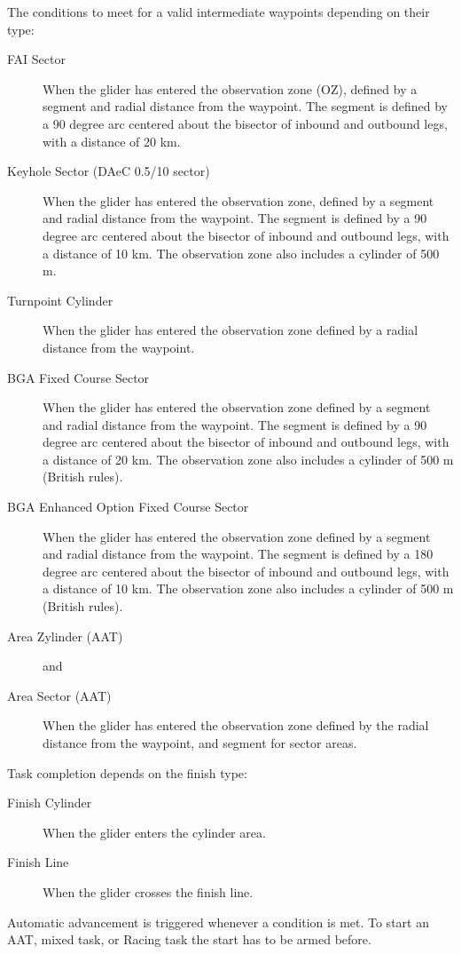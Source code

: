 \documentclass[a4paper,12pt]{refrep}
\begin{document}
The conditions to meet for a valid intermediate waypoints depending on their
 type:
\begin{description}
\item[FAI Sector] When the glider has entered the observation zone (OZ), defined 
by a segment and radial distance from the waypoint.  The segment is
defined by a 90 degree arc centered about the bisector of inbound and
outbound legs, with a distance of 20 km.
\item[Keyhole Sector (DAeC 0.5/10 sector)] When the glider has entered the
observation zone, defined by a segment and radial distance from the waypoint.  The segment is
defined by a 90 degree arc centered about the bisector of inbound and
outbound legs, with a distance of 10 km.  The observation zone also includes
a cylinder of 500 m.
\item[Turnpoint Cylinder]  When the glider has entered the observation zone
defined by a radial distance from the waypoint.
\item[BGA Fixed Course Sector]  When the glider has entered the
observation zone defined by a segment and radial distance from the
waypoint. The segment is defined by a 90 degree arc centered about the
bisector of inbound and outbound legs, with a distance of 20 km.
The observation zone also includes a cylinder of 500 m (British rules).
\item[BGA Enhanced Option Fixed Course Sector]  When the glider has entered the
observation zone defined by a segment and radial distance from the
waypoint. The segment is defined by a 180 degree arc centered about the
bisector of inbound and outbound legs, with a distance of 10 km.
The observation zone also includes a cylinder of 500 m (British rules).
\item[Area Zylinder (AAT)]  and
\item[Area Sector (AAT)]  When the glider has entered the observation zone
defined by the radial distance from the waypoint, and segment for sector areas.
\end{description}

Task completion depends on the finish type:
\begin{description}
\item[Finish Cylinder] When the glider enters the cylinder area.
\item[Finish Line] When the glider crosses the finish line.
\end{description}

Automatic advancement is triggered whenever a condition is met. To start an AAT,
mixed task, or Racing task the start has to be armed before. 
\end{document}
